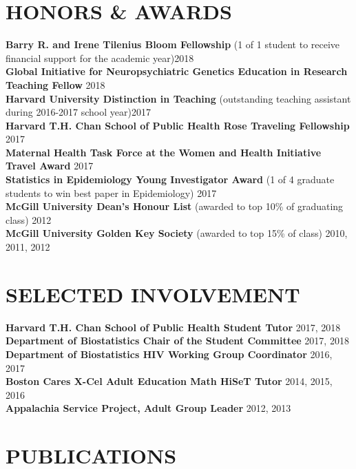 \documentclass[12pt]{article}
\begin{document}
\section*{\textbf{{\large H}{ONORS} {\large \&} {\large A}{WARDS}}}
\textbf{Barry R. and Irene Tilenius Bloom Fellowship} {\footnotesize (1 of 1 student to receive financial support for the academic year)}\hfill \hfill	2018 \\
\textbf{Global Initiative for Neuropsychiatric Genetics Education in Research Teaching Fellow} \hfill \hfill 2018 \\
\textbf{Harvard University Distinction in Teaching} {\footnotesize (outstanding teaching assistant during 2016-2017 school year)}\hfill \hfill	2017 \\
\textbf{Harvard T.H. Chan School of Public Health Rose Traveling Fellowship} \hfill \hfill	2017 \\
\textbf{Maternal Health Task Force at the Women and Health Initiative Travel Award} \hfill \hfill	2017 \\
\textbf{Statistics in Epidemiology Young Investigator Award} {\footnotesize (1 of 4 graduate students to win best paper in Epidemiology)}  \hfill \hfill	2017 \\
\textbf{McGill University Dean's Honour List} {\footnotesize (awarded to top 10\% of graduating class)}  \hfill \hfill	2012 \\
\textbf{McGill University Golden Key Society} {\footnotesize (awarded to top 15\% of class)}  \hfill \hfill2010, 2011, 2012 

\section*{\textbf{{\large S}{ELECTED} {\large I}{NVOLVEMENT}}}
\textbf{Harvard T.H. Chan School of Public Health Student Tutor} \hfill \hfill 2017, 2018 \\
\textbf{Department of Biostatistics Chair of the Student Committee} \hfill \hfill 2017, 2018 \\
\textbf{Department of Biostatistics HIV Working Group Coordinator} \hfill \hfill 2016, 2017 \\
\textbf{Boston Cares X-Cel Adult Education Math HiSeT Tutor} \hfill \hfill 2014, 2015, 2016 \\
\textbf{Appalachia Service Project, Adult Group Leader} \hfill \hfill 2012, 2013

\section*{\textbf{{\large P}{UBLICATIONS}}}
\end{document}
